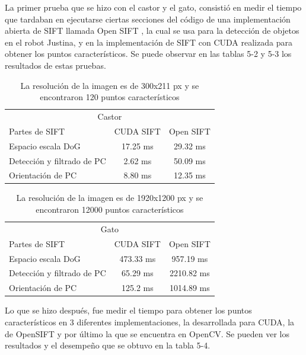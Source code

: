 La primer prueba que se hizo con el castor y el gato, consistió en medir el tiempo que tardaban en ejecutarse ciertas secciones del código de una implementación abierta de SIFT llamada Open SIFT \cite{OpenSIFT}, la cual se usa para la detección de objetos en el robot Justina, y en la implementación de SIFT con CUDA realizada para obtener los puntos característicos. Se puede observar en las tablas 5-2 y 5-3 los resultados de estas pruebas.\\
\begin{table}[H]
\centering
\begin{tabular}{|l|c|c|}
\hline
\multicolumn{3}{|c|}{Castor} \\
\cline{1-3}
Partes de SIFT & CUDA SIFT & Open SIFT\\
\hline \hline
 Espacio escala DoG      & 17.25 ms   &  29.32 ms                        \\ \cline{1-3}
 Detección y filtrado de PC & 2.62 ms   &  50.09 ms    \\ \cline{1-3}
 Orientación de PC       & 8.80 ms   &  12.35 ms                        \\ \cline{1-3}
\end{tabular}
\caption{La resolución de la imagen es de 300x211 px y se encontraron 120 puntos característicos}
\label{tabla:final}
\end{table}
\begin{table}[H]
\centering
\begin{tabular}{|l|c|c|}
\hline
\multicolumn{3}{|c|}{Gato} \\
\cline{1-3}
Partes de SIFT & CUDA SIFT & Open SIFT\\
\hline \hline
 Espacio escala DoG         & 473.33 ms  &  957.19 ms                       \\ \cline{1-3}
 Detección y filtrado de PC & 65.29 ms   &  2210.82 ms                       \\ \cline{1-3}
 Orientación de PC          & 125.2 ms   &  1014.89 ms                      \\ \cline{1-3}
\end{tabular}
\caption{La resolución de la imagen es de 1920x1200 px y se encontraron 12000 puntos característicos}
\label{tabla:final}
\end{table}
Lo que se hizo después, fue medir el tiempo para obtener los puntos característicos en 3 diferentes implementaciones, la desarrollada para CUDA, la de OpenSIFT y por último la que se encuentra en OpenCV. Se pueden ver los resultados y el desempeño que se obtuvo en la tabla 5-4.\\

